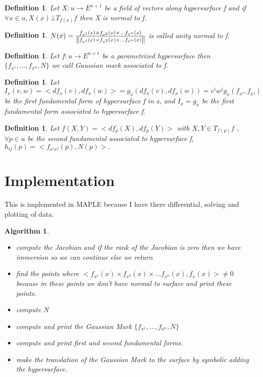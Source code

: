 \documentclass[a4paper]{article}
\newtheorem{algorithm}[theorem]{Algorithm}
\newtheorem{definition}[theorem]{Definition}
\begin{document}
\begin{definition}
Let $X:u\rightarrow E^{n+1}$ be a field of vectors along hypersurface f and
if $\forall x\in u,X(x)\bot T_{f(x)}f$ then X is normal to f.
\end{definition}

\begin{definition}
$N(x)=\frac{f_{x^{1}}(x)\times f_{x^{2}}(x)\times ...f_{x^{n}}(x)}{%
\left\Vert f_{x^{1}}(x)\times f_{x^{2}}(x)\times ...f_{x^{n}}(x)\right\Vert }
$ is called unity normal to f.
\end{definition}

\begin{definition}
Let $f:u\rightarrow E^{n+1}$ be a parametrized hypersurface then $%
\{f_{x^{1}},...,f_{x^{n}},N\}$ we call Gaussian mark associated to f.
\end{definition}

\begin{definition}
Let $%
I_{x}(v,w)=<df_{x}(v),df_{x}(w)>=g_{x}(df_{x}(v),df_{x}(w))=v^{i}w^{j}g_{x}(f_{x^{i}},f_{x^{j}}) 
$ be the first fundamental form of hypersurface f in x, and $I_{x}=g_{x}$ be
the first fundamental form associated to hypersurface f.
\end{definition}

\begin{definition}
Let $f(X,Y)=<df_{p}(X),df_{p}(Y)>$ with $X,Y\in T_{f(p)}f$ , $\forall p\in u$
be the second fundamental associated to hypersurface f,$%
h_{ij}(p)=<f_{x^{i}x^{j}}(p),N(p)>.$
\end{definition}

\section{Implementation}

This is implemented in MAPLE because I have there differential, solving and
plotting of data.

\begin{algorithm}
\ \ 

\begin{itemize}
\item compute the Jacobian and if the rank of the Jacobian is zero then we
have immersion so we can continue else we return

\item find the points where $<f_{x^{1}}(x)\times f_{x^{2}}(x)\times
...f_{x^{n}}(x),f_{x}(x)>\neq 0$ because in these points we don't have
normal to surface and print these points.

\item compute N

\item compute and print the Gaussian Mark $\{f_{x^{1}},...,f_{x^{n}},N\}$

\item compute and print first and second fundamental forms.

\item make the translation of the Gaussian Mark to the surface by symbolic
adding the hypersurface.
\end{itemize}
\end{algorithm}
\end{document}
